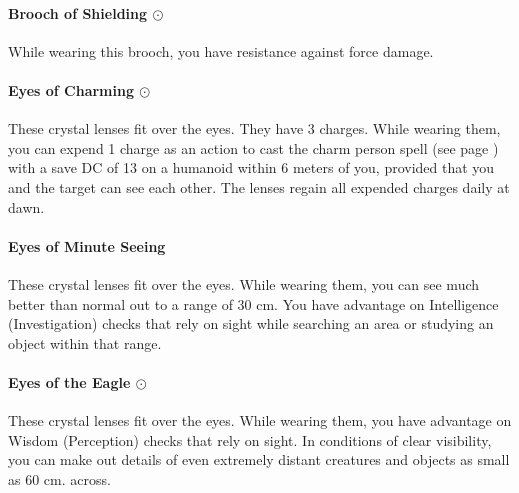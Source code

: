     \paragraph{Brooch of Shielding $\odot$}
        While wearing this brooch, you have resistance against force damage.
    \paragraph{Eyes of Charming $\odot$}
        These crystal lenses fit over the eyes.
        They have 3 charges.
        While wearing them, you can expend 1 charge as an action to cast the charm person spell (see page \pageref{spell::charmperson}) with a save DC of 13 on a humanoid within 6 meters of you, provided that you and the target can see each other.
        The lenses regain all expended charges daily at dawn.
    \paragraph{Eyes of Minute Seeing}
        These crystal lenses fit over the eyes.
        While wearing them, you can see much better than normal out to a range of 30 cm.
        You have advantage on Intelligence (Investigation) checks that rely on sight while searching an area or studying an object within that range.
    \paragraph{Eyes of the Eagle $\odot$}
        These crystal lenses fit over the eyes.
        While wearing them, you have advantage on Wisdom (Perception) checks that rely on sight.
        In conditions of clear visibility, you can make out details of even extremely distant creatures and objects as small as 60 cm. across.
\newpage~\newpage
